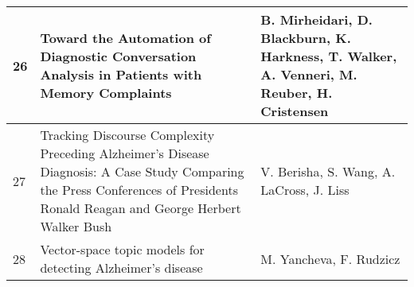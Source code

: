 \documentclass[12pt]{article}
\begin{document}
\begin{longtable}{ p{1cm} | p{6cm} | p{6cm}}
	26 & Toward the Automation of Diagnostic Conversation Analysis in Patients with Memory Complaints & B. Mirheidari, D. Blackburn, K. Harkness, T. Walker, A. Venneri, M. Reuber, H. Cristensen \\ \hline
	27 & Tracking Discourse Complexity Preceding Alzheimer's Disease Diagnosis: A Case Study Comparing the Press Conferences of Presidents Ronald Reagan and George Herbert Walker Bush & V. Berisha, S. Wang, A. LaCross, J. Liss \\ \hline
	28 & Vector-space topic models for detecting Alzheimer's disease & M. Yancheva, F. Rudzicz \\ \hline
\end{longtable}
\end{document}
